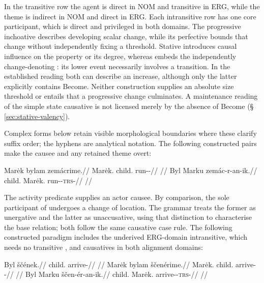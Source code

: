 In the transitive row the agent is direct in NOM and transitive in ERG,
while the theme is indirect in NOM and direct in ERG. Each intransitive row
has one core participant, which is direct and privileged in both domains.
The progressive inchoative describes developing scalar change, while its
perfective bounds that change without independently fixing a threshold.
Stative  introduces causal influence on the property or its
degree, whereas  embeds the independently change-denoting
: its lower event necessarily involves a transition. In the
established  reading both can describe an increase, although
only the latter explicitly contains Become. Neither construction supplies an
absolute size threshold or entails that a progressive change culminates.
A maintenance reading of the simple state causative is not licensed merely
by the absence of Become (§\,\ref{sec:stative-valency}).

Complex forms below retain visible morphological boundaries where these
clarify suffix order; the hyphens are analytical notation. The following
constructed pairs make the causee and any retained theme overt:

\pex\label{ex:val-caus-intransitive}
\a
\begingl
\gla Marėk bylam zemácrime.//
\glb Marėk.\Dir{} child.\Ind{} run-\Caus{}-\Prog{}//
\glft {}//
\endgl
\a
\begingl
\gla Byl Marku zemác-r-an-ik.//
\glb child.\Dir{} Marėk.\Trs{} run-\Caus{}-\textsc{trs}-\Pf{}//
\glft {}//
\endgl
\xe

The activity predicate   supplies an actor causee.
By comparison, the sole participant of   undergoes a
change of location. The grammar treats the former as unergative and the latter
as unaccusative, using that distinction to characterise the base relation;
both follow the same causative case rule. The following constructed paradigm
includes the underived ERG-domain intransitive, which needs no transitive
, and causatives in both alignment domains:

\pex\label{ex:val-unaccusative}
\a
\begingl
\gla Byl ščének.//
\glb child.\Dir{} arrive-\Pf{}//
\glft {}//
\endgl
\a
\begingl
\gla Marėk bylam ščenérime.//
\glb Marėk.\Dir{} child.\Ind{} arrive-\Caus{}-\Prog{}//
\glft {}//
\endgl
\a
\begingl
\gla Byl Marku ščen-ér-an-ik.//
\glb child.\Dir{} Marėk.\Trs{} arrive-\Caus{}-\textsc{trs}-\Pf{}//
\glft {}//
\endgl
\xe

